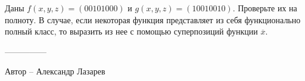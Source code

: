 \question
Даны $f(x, y, z) = (00101000)$ и $g(x, y, z) = (10010010)$. Проверьте их на полноту. В случае, если некоторая функция представляет из себя функционально полный класс, то выразить из нее с помощью суперпозиций функции $\overline{x}$.

---------------

Автор -- Александр Лазарев